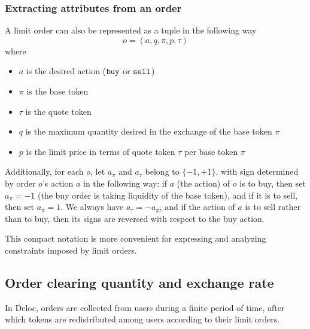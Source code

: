 \documentclass[11pt, reqno]{amsart}
\theoremstyle{definition}
\theoremstyle{remark}
\newcommand{\buy}{\textnormal{\texttt{buy}}}
\newcommand{\sell}{\textnormal{\texttt{sell}}}
\begin{document}
\subsubsection{Extracting attributes from an order}
A limit order can also be represented as a tuple in the following way
\[
	o = (a, q, \pi, p, \tau)
\]
where
\begin{itemize}
	\item $a$ is the desired action ($\buy$ or $\sell$)
    \item $\pi$ is the base token
    \item $\tau$ is the quote token
    \item $q$ is the maximum quantity desired in the exchange of the base token
          $\pi$
	\item $p$ is the limit price in terms of quote token $\tau$ per base token
          $\pi$
\end{itemize}
Additionally, for each $o$, let $a_\pi$ and $a_\tau$ belong to
$\{-1, +1\}$, with sign determined by order $o$'s action $a$ in the following
way: if $a$ (the action) of $o$ is to buy, then set $a_\pi = -1$ (the buy
order is taking liquidity of the base token), and if it is to sell, then
set $a_\pi = 1$. We always have $a_\tau = -a_\pi$, and if the action
of $a$ is to sell rather than to buy, then its signs are reversed with
respect to the buy action.

This compact notation is more convenient for expressing and analyzing
constraints imposed by limit orders.

\subsection{Order clearing quantity and exchange rate}
In Deloc, orders are collected from users during a finite period of time,
after which tokens are redistributed among users according to their limit
orders.
\end{document}
